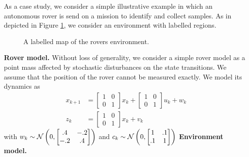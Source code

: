 As a case study, we consider a simple illustrative example in which an autonomous rover is send on a mission to identify and collect samples.
As in depicted in Figure \ref{fig:Scenario}, we consider an environment with labelled regions. 
\begin{figure}

\caption{A labelled map of the rovers environment. }\label{fig:Scenario}
\end{figure}


\textbf{Rover model.} Without loss of generality, we consider a simple rover model as a point mass affected by stochastic disturbances on the state transitions. We assume that the position of the rover cannot be measured exactly. 
We model its dynamics as
\begin{align}
	x_{k+1}&=\begin{bmatrix}
		1&0\\
		0&1
	\end{bmatrix} x_{k} + \begin{bmatrix}
		1&0\\
		0&1
	\end{bmatrix} u_k+ w_k\\
z_k&=\begin{bmatrix}
		1&0\\
		0&1
	\end{bmatrix}x_k+v_k
\end{align}
with $w_k\sim \mathcal{N} \left(0,\begin{bmatrix}.4&-.2\\-.2&.4\end{bmatrix}\right)$ and $c_k\sim \mathcal{N} \left(0,\begin{bmatrix}1&.1\\.1&1\end{bmatrix}\right)$
\textbf{Environment model.} 

